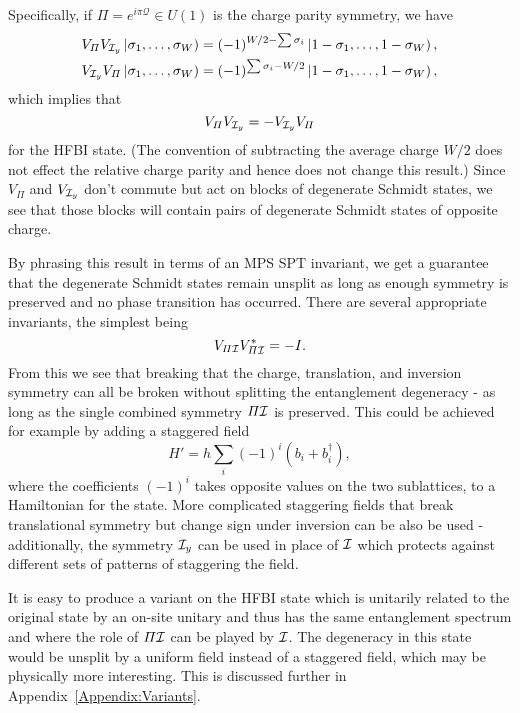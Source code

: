 Specifically, if $\varPi = e^{i \pi \mathcal{Q}} \in U(1)$ is the charge parity symmetry, we have
\begin{equation*}
\begin{split}
V_{\varPi} V_{\mathcal{I}_y}\left |\sigma_1, \ldots, \sigma_{W} \right ) &= (-1)^{W/2-\sum\sigma_i} \left |1-\sigma_1, \ldots, 1-\sigma_{W} \right ), \\
V_{\mathcal{I}_y} V_{\varPi} \left |\sigma_1, \ldots, \sigma_{W} \right ) &= (-1)^{\sum\sigma_i-W/2} \left |1-\sigma_1, \ldots, 1-\sigma_{W} \right ), \\
\end{split}
\end{equation*}
which implies that 
\begin{equation}
V_{\varPi} V_{\mathcal{I}_y} = - V_{\mathcal{I}_y} V_{\varPi}
\label{eq:hfbisym}
\end{equation}
for the HFBI state.
(The convention of subtracting the average charge $W/2$ does not effect the relative charge parity 
and hence does not change this result.)
Since $V_{\varPi}$ and $V_{\mathcal{I}_y}$ don't commute but act on blocks of degenerate Schmidt states,
we see that those blocks will contain pairs of degenerate Schmidt states of opposite charge.

By phrasing this result in terms of an MPS SPT invariant, we get a guarantee that the 
degenerate Schmidt states remain unsplit as long as enough symmetry is preserved and no phase 
transition has occurred. There are several appropriate invariants, the simplest being  
$$
V_{\varPi \mathcal{I}} V_{\varPi \mathcal{I}}^* = -I. 
$$
From this we see that breaking that the charge, translation, and inversion symmetry can all 
be broken without splitting the entanglement degeneracy - as long as the single combined symmetry
$\varPi \mathcal{I} $ is preserved. This could be achieved for example by adding a staggered field 
$$
H' = h \sum\limits_{i} (-1)^i \left(b_i + b_i^{\dagger}\right),
$$
where the coefficients $(-1)^i$ takes opposite values on the two sublattices, 
to a Hamiltonian for the state. More complicated staggering fields that break translational 
symmetry but change sign under inversion can be also be used - additionally, the symmetry $\mathcal{I}_y$ 
can be used in place of $\mathcal{I}$ which protects against different sets of patterns of staggering the 
field.

It is easy to produce a variant on the HFBI state which is unitarily related to the original
state by an on-site unitary and thus has the same entanglement spectrum and where the role
of $\varPi \mathcal{I}$ can be played by $\mathcal{I}$. The degeneracy in this state would be unsplit by a uniform
field instead of a staggered field, which may be physically more interesting. 
This is discussed further in Appendix~\ref{Appendix:Variants}.

